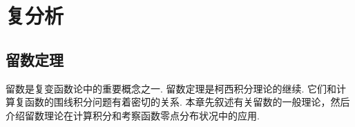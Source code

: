 \part{复分析}

\chapter{留数定理}
留数是复变函数论中的重要概念之一.
留数定理是柯西积分理论的继续.
它们和计算复函数的围线积分问题有着密切的关系.
本章先叙述有关留数的一般理论，然后介绍留数理论在计算积分和考察函数零点分布状况中的应用.




